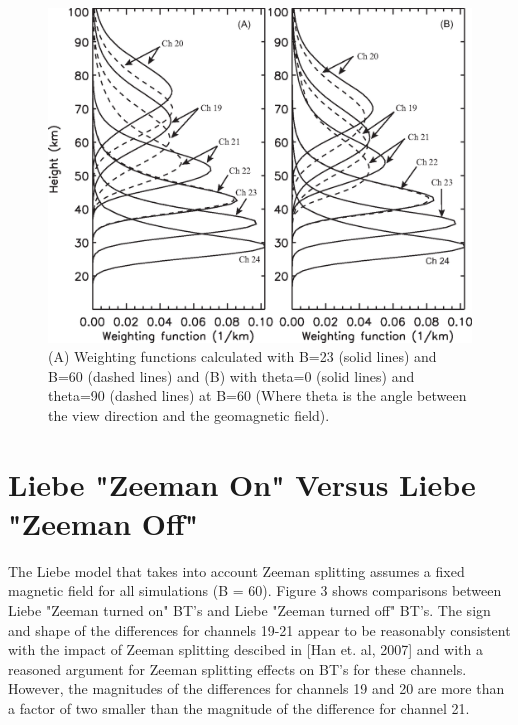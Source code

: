 \begin{figure}[htp]
  \centering{}
  \includegraphics[scale=0.8]{./graphics/Figure2.eps}
  \caption{(A) Weighting functions calculated with B=23\microtesla{} (solid lines) and B=60\microtesla{} (dashed lines) and (B) with theta=0 (solid lines) and theta=90 (dashed lines)
  at B=60\microtesla{} (Where theta is the angle between the view direction and the geomagnetic field).}
\end{figure}

\newpage
\section{Liebe "Zeeman On" Versus Liebe "Zeeman Off"}
The Liebe model that takes into account Zeeman splitting assumes a fixed magnetic field
for all simulations (B = 60\microtesla{}). Figure 3 shows comparisons between Liebe "Zeeman turned
on" BT's and Liebe "Zeeman turned off" BT's. The sign and shape of the differences for channels 19-21 appear to be reasonably consistent 
with the impact of Zeeman splitting descibed in [Han et. al, 2007] and with a reasoned argument
for Zeeman splitting effects on BT's for these channels. However, the magnitudes of the differences for channels 19 and 20 are more than a factor of 
two smaller than the magnitude of the difference for channel 21. 
 
